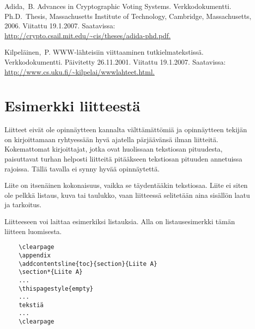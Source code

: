 \documentclass[english,12pt,a4paper,dvips]{article}
\begin{document}
\begin{thebibliography}{99}
 Adida,\ B.  Advances in Cryptographic Voting Systems.
  Verkkodokumentti. Ph.D.\ Thesis, Massachusetts Institute of
  Technology, Cambridge, \foreignlanguage{english}{Massachusetts,}
  2006. Viitattu 19.1.2007.  Saatavissa:
  \url{http://crypto.csail.mit.edu/~cis/theses/adida-phd.pdf.}

 Kilpeläinen,\ P. WWW-lähteisiin viittaaminen
  tutkielmatekstissä. Verkkodokumentti. Päivitetty 26.11.2001.
  Viitattu 19.1.2007. Saatavissa:
  \url{http://www.cs.uku.fi/~kilpelai/wwwlahteet.html.}

\end{thebibliography}

\appendix 

\clearpage
{}
\section{Esimerkki liitteestä\label{LiiteA}}
\renewcommand{\theequation}{A\arabic{equation}}
\setcounter{equation}{0}  
\renewcommand{\thefigure}{A\arabic{figure}}
\setcounter{figure}{0}
\renewcommand{\thetable}{A\arabic{table}}
\setcounter{table}{0}

Liitteet eivät ole opinnäytteen kannalta välttämättömiä ja 
opinnäytteen tekijän on 
kirjoittamaan ryhtyessään hyvä ajatella pärjäävänsä ilman liitteitä.
Kokemattomat kirjoittajat, jotka ovat huolissaan
tekstiosan pituudesta, paisuttavat turhan 
helposti liitteitä pitääkseen tekstiosan pituuden annetuissa rajoissa.
Tällä tavalla ei synny hyvää opinnäytettä.   

Liite on itsenäinen kokonaisuus, vaikka se täydentääkin tekstiosaa.
Liite ei siten ole pelkkä listaus, kuva tai taulukko, vaan 
liitteessä selitetään aina sisällön laatu ja tarkoitus. 

Liitteeseen voi laittaa esimerkiksi listauksia. Alla on 
listausesimerkki tämän liitteen luomisesta. 

\begin{verbatim}
	\clearpage
	\appendix
	\addcontentsline{toc}{section}{Liite A}
	\section*{Liite A}
	...
	\thispagestyle{empty}
	...
	tekstiä
	...
	\clearpage
\end{verbatim}
\end{document}

